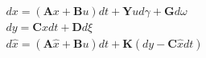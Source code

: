 $$
\begin{array}{l}
d x=(\mathbf{A} x+\mathbf{B} u) dt +\mathbf{Y} u d \gamma+\mathbf{G} d \omega \\
d y=\mathbf{C} x dt+\mathbf{D} d \xi\\
d \hat{x}=(\mathbf{A} \hat{x}+\mathbf{B} u) dt+\mathbf{K}(dy-\mathbf{C} \hat{x} dt)
\end{array}
$$
